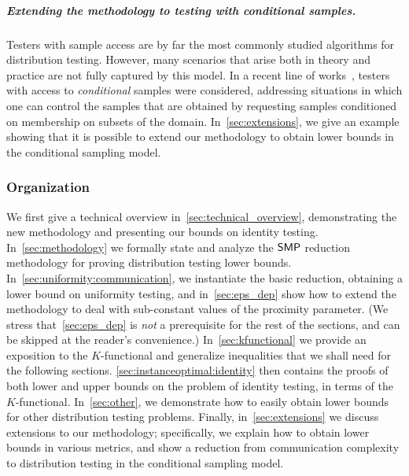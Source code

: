 \subparagraph{Extending the methodology to testing with conditional samples.} Testers with sample access are by far the most commonly studied algorithms for distribution testing. However, many scenarios that arise both in theory and practice are not  fully captured by this model. In a recent line of works~\cite{CFGM:13,CRS:15,ACK:14,FJOPS:15,FLV:16}, testers with access to \emph{conditional} samples were considered, addressing situations in which one can control the samples that are obtained by requesting samples conditioned on membership on subsets of the domain. In~\cref{sec:extensions}, we give an example showing that it is possible to extend our methodology to obtain lower bounds in the conditional sampling model.

\subsubsection{Organization}
We first give a technical overview in~\cref{sec:technical_overview}, demonstrating the new methodology and presenting our bounds on identity testing. %
In~\cref{sec:methodology} we formally state and analyze the $\mathsf{SMP}$ reduction methodology for proving distribution testing lower bounds. In~\cref{sec:uniformity:communication}, we instantiate the basic reduction, obtaining a lower bound on uniformity testing, and in~\cref{sec:eps_dep} show how to extend the methodology to deal with sub-constant values of the proximity parameter. (We stress that~\cref{sec:eps_dep} is \emph{not} a prerequisite for the rest of the sections, and can be skipped at the reader's convenience.) In~\cref{sec:kfunctional} we provide an exposition to the $K$-functional and generalize inequalities that we shall need for the following sections. \cref{sec:instanceoptimal:identity} then contains the proofs of both lower and upper bounds on the problem of identity testing, in terms of the $K$-functional. In~\cref{sec:other}, we demonstrate how to easily obtain lower bounds for other distribution testing problems. Finally, in~\cref{sec:extensions} we discuss extensions to our methodology; specifically, we explain how to obtain lower bounds in various metrics, and show a reduction from communication complexity to distribution testing in the conditional sampling model.

